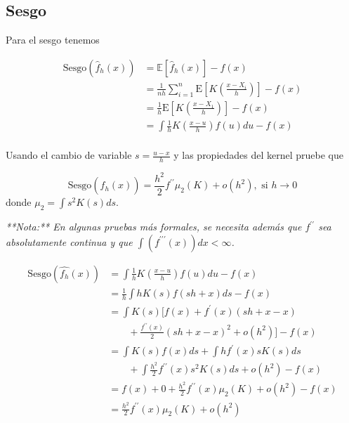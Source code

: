 \documentclass[
  12pt,
]{book}
\theoremstyle{definition}
\theoremstyle{definition}
\theoremstyle{definition}
\theoremstyle{remark}
\let\BeginKnitrBlock\begin \let\EndKnitrBlock\end
\begin{document}
\hypertarget{sesgo-1}{%
\subsection{Sesgo}\label{sesgo-1}}

Para el sesgo tenemos

\begin{align*}
\mathrm{Sesgo}\left(\hat{f}_{h}(x)\right)
& = \mathbb{E}\left[\hat{f}_{h}(x)\right]-f(x)                                                  \\
& = \frac{1}{nh} \sum_{i=1}^{n} \mathrm{E}\left[K\left( \frac{x-X_{i}}{h} \right)\right] - f(x) \\
& = \frac{1}{h}\mathrm{E}\left[K\left( \frac{x-X_{1}}{h} \right)\right] - f(x)                  \\
& = \int \frac{1}{h} K\left( \frac{x-u}{h}\right)f(u)du -f(x)                                   \\
\end{align*}

\BeginKnitrBlock{exercise}
\protect\hypertarget{exr:unnamed-chunk-23}{}{\label{exr:unnamed-chunk-23} }Usando el cambio de variable \(s=\frac{u-x}{h}\) y las propiedades del kernel pruebe que

\begin{equation*}
\mathrm{Sesgo}\left(\hat{f}_{h}(x)\right) = \frac{h^{2}}{2} f^{\prime\prime} \mu_{2}(K) + o(h^{2}), \text{ si } h\to 0
\end{equation*}
donde \(\mu_{2}=\int s^{2}K(s)ds\).

\emph{**Nota:** En algunas pruebas más formales, se necesita
además que  $f^{\prime\prime}$ sea absolutamente continua y que
$\int(f^{\prime\prime\prime}(x))dx<\infty$.}
\EndKnitrBlock{exercise}

\BeginKnitrBlock{solution}
{}\begin{align*}
\mathrm{Sesgo}(\hat{f_{h}}(x)) & = \int \frac{1}{h} K\left( \frac{x-u}{h} \right) f(u)du - f(x)     \\
& = \frac{1}{h} \int hK(s)f(sh+x) ds - f(x) \\
& = \int K(s)\Biggl[ f(x) + f^{\prime}(x)(sh+x-x)  \\
&  \qquad  + \frac{f^{\prime\prime}(x)}{2}(sh+x-x)^2 + o(h^{2}) \Biggr] - f(x) \\
& = \int K(s)f(x)ds + \int hf^{\prime}(x)sK(s) ds  \\
& \qquad  + \int \frac{h^2}{2} f^{\prime\prime}(x)s^2K(s) ds + o(h^2) - f(x) \\
& = f(x) + 0 + \frac{h^2}{2}f^{\prime\prime}(x)\mu_{2}(K) + o(h^2) - f(x)   \\
& = \frac{h^2}{2}f^{\prime\prime}(x)\mu_{2}(K) + o(h^2) \\
\end{align*}
\EndKnitrBlock{solution}
\end{document}
